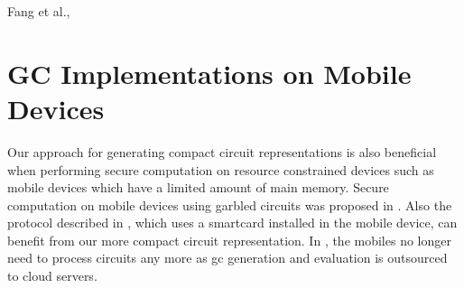 Fang et al., \cite{fang2017secure}

\section{GC Implementations on Mobile Devices} \label{sec:related-mobile}
Our approach for generating compact circuit representations is also beneficial when performing secure computation on resource constrained devices such as mobile devices which have a limited amount of main memory.
Secure computation on mobile devices using garbled circuits was proposed in \cite{huang2011privacy}.
Also the protocol described in \cite{demmler2014ad}, which uses a smartcard installed in the mobile device, can benefit from our more compact circuit representation.
In \cite{carter2016secure, carter2014whitewash}, the mobiles no longer need to process circuits any more as \acrshort{gc} generation and evaluation is outsourced to cloud servers.
